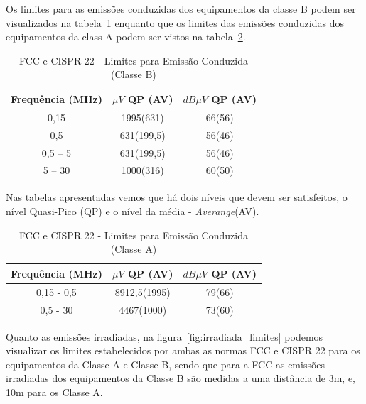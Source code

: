 Os limites para as emissões conduzidas dos equipamentos da classe B podem ser visualizados na tabela~\ref{tab:TABLE_Conduzida_ClasseB} enquanto que os limites das emissões conduzidas dos equipamentos da class A podem ser vistos na tabela~\ref{tab:TABLE_Conduzida_ClasseA}.

\begin{table}[htb!]
  \centering
  \caption{FCC e CISPR 22 - Limites para Emissão Conduzida (Classe B)}
  \label{tab:TABLE_Conduzida_ClasseB}
  \begin{tabular}{|c|c|c|}
\hline
Frequência (MHz)    &   $\mu V$ QP (AV) &   $dB\mu V$ QP (AV)\\	\hline\hline
0,15	&	1995(631)	&	66(56)	\\	%
0,5	&	631(199,5)	&	56(46)	\\	%
0,5 – 5	&	631(199,5)	&	56(46)	\\	%
5 – 30	&	1000(316)	&	60(50)	\\	\hline
  \end{tabular}
\end{table}

Nas tabelas apresentadas vemos que há dois níveis que devem ser satisfeitos, o nível Quasi-Pico (QP) e o nível da média - \textit{Averange}(AV).

\begin{table}[htb!]
  \centering
  \caption{FCC e CISPR 22 - Limites para Emissão Conduzida (Classe A)}
  \label{tab:TABLE_Conduzida_ClasseA}
  \begin{tabular}{|c|c|c|}
\hline
Frequência (MHz)    &   $\mu V$ QP (AV) &   $dB\mu V$ QP (AV)\\	\hline\hline
0,15 - 0,5	&	8912,5(1995)	&	79(66)	\\	%
0,5 - 30	&	4467(1000)	&	73(60)	\\	\hline
  \end{tabular}
\end{table}

Quanto as emissões irradiadas, na figura~\ref{fig:irradiada_limites} podemos visualizar os limites estabelecidos por ambas as normas FCC e CISPR 22 para os equipamentos da Classe A e Classe B, sendo que para a FCC as emissões irradiadas dos equipamentos da Classe B são medidas a uma distância de 3m, e, 10m para os Classe A.

